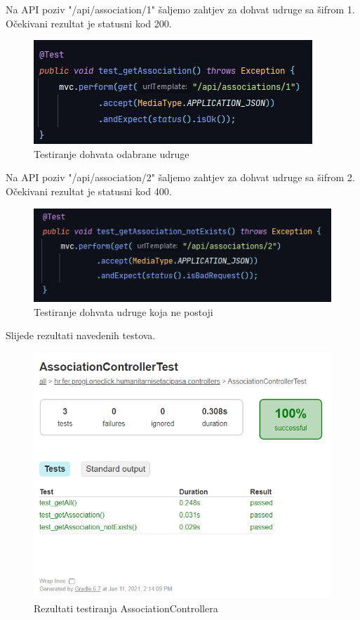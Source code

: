 	\noindent  Na API poziv "/api/association/1" šaljemo zahtjev za dohvat udruge sa šifrom 1. Očekivani rezultat je statusni kod 200.

	\begin{figure}[H]
		\includegraphics[width=\linewidth]{slike/Testovi-14.png}
		\centering
		\caption{Testiranje dohvata odabrane udruge}
		\label{fig:testovi14}
	\end{figure}

	\noindent Na API poziv "/api/association/2" šaljemo zahtjev za dohvat udruge sa šifrom 2. Očekivani rezultat je statusni kod 400.

	\begin{figure}[H]
		\includegraphics[width=\linewidth]{slike/Testovi-15.png}
		\centering
		\caption{Testiranje dohvata udruge koja ne postoji}
		\label{fig:testovi15}
	\end{figure}

	\eject

	\noindent Slijede rezultati navedenih testova.

	\begin{figure}[H]
		\includegraphics[width=\linewidth]{slike/Testovi-17.png}
		\centering
		\caption{Rezultati testiranja AssociationControllera}
		\label{fig:testovi17}
	\end{figure}
	
